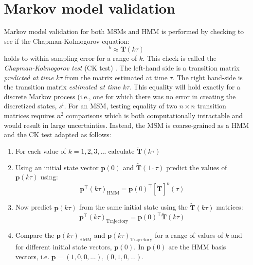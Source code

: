 \section{Markov model validation}\label{sec:model_validation}
Markov model validation for both MSMs and HMM is performed by checking to see if the Chapman-Kolmogorov equation: 
\begin{equation}
[\mathbf{T}(\tau)]^{k} \approx \mathbf{T}(k \tau)
\end{equation}
holds to within sampling error for a range of $k$. This check is called the \emph{Chapman-Kolmogorov test} (CK test) \cite{prinzMarkovModelsMolecular2011}.  The left-hand side is a transition matrix \emph{predicted at time $k\tau$} from the matrix estimated at time $\tau$. The right hand-side is the transition matrix \emph{estimated at time $k\tau$}. This equality will hold exactly for a discrete Markov process (i.e., one for which there was no error in creating the discretized states, $s^i$. \cite{prinzMarkovModelsMolecular2011} For an MSM, testing equality of two $n \times n$ transition matrices requires $n^{2}$ comparisons which is both computationally intractable and would result in large uncertainties. \cite{prinzMarkovModelsMolecular2011} Instead, the MSM is coarse-grained as a HMM and the CK test adapted as follows: \cite{prinzMarkovModelsMolecular2011}
\begin{enumerate}
    \item For each value of $k = 1, 2, 3, \ldots$ calculate $\widetilde{\mathbf{T}}(
    k\tau)$
    \item Using an initial state vector $\mathbf{p}(0)$ and $\widetilde{\mathbf{T}}(1\cdot\tau)$ predict the values of $\mathbf{p}(k\tau)$ using: 
    \begin{equation*}
        \mathbf{p}^{\top}(k\tau)_{\mathrm{HMM}} = \mathbf{p}(0)^{\top}[\widetilde{\mathbf{T}}]^{k}(\tau)
    \end{equation*}
    \item Now predict $\mathbf{p}(k\tau)$ from the same initial state using the  $\widetilde{\mathbf{T}}(k\tau)$ matrices: 
    \begin{equation*}
        \mathbf{p}^{\top}(k\tau)_{\mathrm{Trajectory}} = \mathbf{p}(0)^{\top}\widetilde{\mathbf{T}}(k\tau)
    \end{equation*}
    \item Compare the $\mathbf{p}(k\tau)_{\mathrm{HMM}}$ and $\mathbf{p}(k\tau)_{\mathrm{Trajectory}}$ for a range of values of $k$ and for different initial state vectors, $\mathbf{p}(0)$. In \cite{schererPyEMMASoftwarePackage2015a} $\mathbf{p}(0)$ are the HMM basis vectors, i.e. $\mathbf{p} = (1, 0, 0, \ldots),(0, 1, 0, \ldots)$. 
\end{enumerate}

